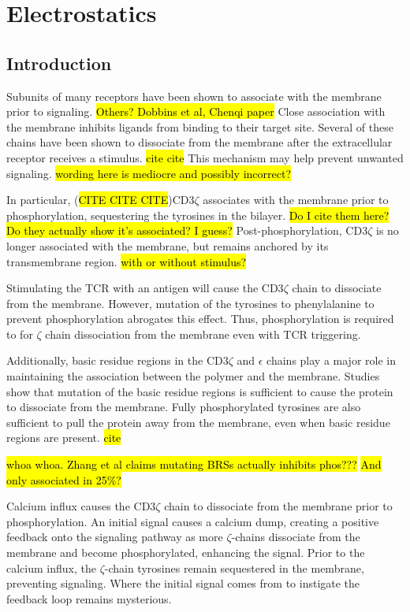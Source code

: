 \documentclass[../../AdvancementSummary.tex]{subfiles}
\begin{document}
\section{Electrostatics}

\subsection{Introduction}

Subunits of many receptors have been shown to associate with the membrane prior to signaling. \hl{Others?  Dobbins et al, Chenqi paper} Close association with the membrane inhibits ligands from binding to their target site. Several of these chains have been shown to dissociate from the membrane after the extracellular receptor receives a stimulus. \hl{cite cite} This mechanism may help prevent unwanted signaling. \hl{wording here is mediocre and possibly incorrect?}

In particular, (\hl{CITE CITE CITE})CD3$\zeta$ associates with the membrane prior to phosphorylation, sequestering the tyrosines in the bilayer. \cite{Shi2013} \hl{Do I cite them here? Do they actually show it's associated?  I guess?} Post-phosphorylation, CD3$\zeta$ is no longer associated with the membrane, but remains anchored by its transmembrane region. \hl{with or without stimulus?}

Stimulating the TCR with an antigen will cause the CD3$\zeta$ chain to dissociate from the membrane. However, mutation of the tyrosines to phenylalanine to prevent phosphorylation abrogates this effect. Thus, phosphorylation is required to for $\zeta$ chain dissociation from the membrane even with TCR triggering. \cite{Zhang2011}

Additionally, basic residue regions in the CD3$\zeta$ and $\epsilon$ chains play a major role in maintaining the association between the polymer and the membrane. Studies show that mutation of the basic residue regions is sufficient to cause the protein to dissociate from the membrane.\cite{Zhang2011} Fully phosphorylated tyrosines are also sufficient to pull the protein away from the membrane, even when basic residue regions are present. \hl{cite} 

\hl{whoa whoa. Zhang et al claims mutating BRSs actually inhibits phos???}
\hl{And only associated in 25\%?}

Calcium influx causes the CD3$\zeta$ chain to dissociate from the membrane prior to phosphorylation. An initial signal causes a calcium dump, creating a positive feedback onto the signaling pathway as more $\zeta$-chains dissociate from the membrane and become phosphorylated, enhancing the signal.  \cite{Shi2013} Prior to the calcium influx, the $\zeta$-chain tyrosines remain sequestered in the membrane, preventing signaling. Where the initial signal comes from to instigate the feedback loop remains mysterious.
\end{document}
